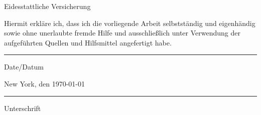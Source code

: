 \begin{titlepage}
\begin{center}{Eidesstattliche Versicherung}
\end{center}
Hiermit erkl\"are ich, dass ich die vorliegende Arbeit selbstst\"andig und
eigenh\"andig sowie ohne unerlaubte fremde Hilfe und ausschlie\ss{}lich unter
Verwendung der aufgef\"uhrten Quellen und Hilfsmittel angefertigt habe. 
\vfill
\begin{center}
\noindent
\begin{minipage}{0.5\textwidth}
\begin{flushleft}
\rule{5cm}{0.4pt}
Date/Datum 
\end{flushleft}
\end{minipage}%
\begin{minipage}{0.5\textwidth}
\begin{flushright} 
New York, den \today \\
\rule{5cm}{0.4pt}
Unterschrift
\end{flushright}
\end{minipage}


\end{center}
\end{titlepage}
